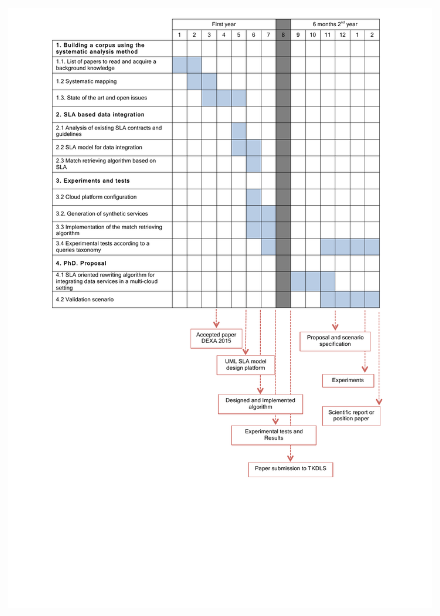 \documentclass[12pt,a4paper,oneside]{report}
\begin{document}
\begin{figure}[!h]
\center
\includegraphics[scale=0.95]{calendario.pdf} 
\end{figure}



\end{document}
